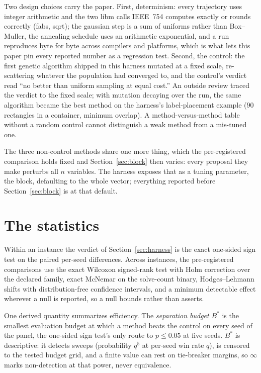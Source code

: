 \documentclass[11pt]{article}
\begin{document}
Two design choices carry the paper. First, determinism: every trajectory uses integer
arithmetic and the two libm calls IEEE~754 computes exactly or rounds correctly (fabs,
sqrt); the gaussian step is a sum of uniforms rather than Box--Muller, the annealing
schedule uses an arithmetic exponential, and a run reproduces byte for byte across
compilers and platforms, which is what lets this paper pin every reported number as a
regression test. Second, the control: the first genetic algorithm shipped in this harness
mutated at a fixed scale, re-scattering whatever the population had converged to, and the
control's verdict read ``no better than uniform sampling at equal cost.'' An outside review
traced the verdict to the fixed scale; with mutation decaying over the run, the same
algorithm became the best method on the harness's label-placement example (90 rectangles in
a container, minimum overlap). A method-versus-method table without a random control cannot
distinguish a weak method from a mis-tuned one.

The three non-control methods share one more thing, which the pre-registered comparison holds
fixed and Section~\ref{sec:block} then varies: every proposal they make perturbs all $n$
variables. The harness exposes that as a tuning parameter, the block, defaulting to the whole
vector; everything reported before Section~\ref{sec:block} is at that default.

\section{The statistics}\label{sec:stats}

Within an instance the verdict of Section~\ref{sec:harness} is the exact one-sided sign
test on the paired per-seed differences. Across instances, the pre-registered comparisons
use the exact Wilcoxon signed-rank test with Holm correction over the declared family,
exact McNemar on the solve-count binary, Hodges--Lehmann shifts with distribution-free
confidence intervals, and a minimum detectable effect wherever a null is reported, so a
null bounds rather than asserts.

One derived quantity summarizes efficiency. The \emph{separation budget} $B^{*}$ is the
smallest evaluation budget at which a method beats the control on every seed of the panel,
the one-sided sign test's only route to $p \le 0.05$ at five seeds. $B^{*}$ is
descriptive: it detects sweeps (probability $q^{5}$ at per-seed win rate $q$), is censored
to the tested budget grid, and a finite value can rest on tie-breaker margins, so
$\infty$ marks non-detection at that power, never equivalence.
\end{document}
